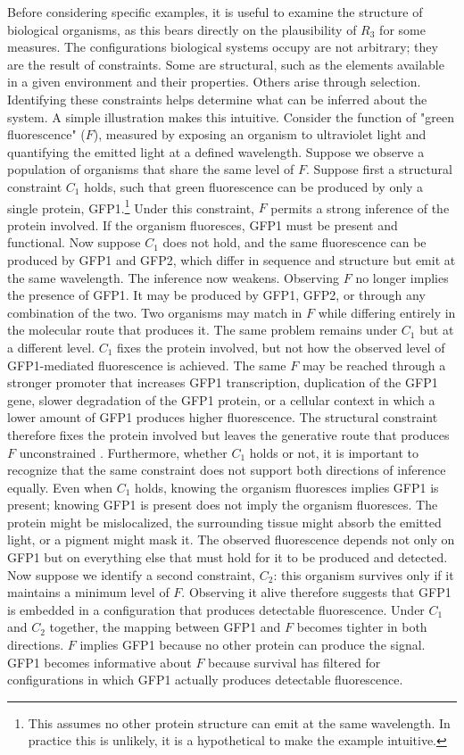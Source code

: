 \documentclass[twocolumn]{article} %
\begin{document}
Before considering specific examples, it is useful to examine the structure of biological organisms, as this bears directly on the plausibility of $R_3$ for some measures. The configurations biological systems occupy are not arbitrary; they are the result of constraints. Some are structural, such as the elements available in a given environment and their properties. Others arise through selection. Identifying these constraints helps determine what can be inferred about the system. A simple illustration makes this intuitive. Consider the function of "green fluorescence" ($F$), measured by exposing an organism to ultraviolet light and quantifying the emitted light at a defined wavelength. Suppose we observe a population of organisms that share the same level of $F$. Suppose first a structural constraint $C_1$ holds, such that green fluorescence can be produced by only a single protein, GFP1.\footnote{This assumes no other protein structure can emit at the same wavelength. In practice this is unlikely, it is a hypothetical to make the example intuitive.} Under this constraint, $F$ permits a strong inference of the protein involved. If the organism fluoresces, GFP1 must be present and functional. Now suppose $C_1$ does not hold, and the same fluorescence can be produced by GFP1 and GFP2, which differ in sequence and structure but emit at the same wavelength. The inference now weakens. Observing $F$ no longer implies the presence of GFP1. It may be produced by GFP1, GFP2, or through any combination of the two. Two organisms may match in $F$ while differing entirely in the molecular route that produces it. The same problem remains under $C_1$ but at a different level. $C_1$ fixes the protein involved, but not how the observed level of GFP1-mediated fluorescence is achieved. The same $F$ may be reached through a stronger promoter that increases GFP1 transcription, duplication of the GFP1 gene, slower degradation of the GFP1 protein, or a cellular context in which a lower amount of GFP1 produces higher fluorescence. The structural constraint therefore fixes the protein involved but leaves the generative route that produces $F$ unconstrained \citep[a]{tononi1999measures}. Furthermore, whether $C_1$ holds or not, it is important to recognize that the same constraint does not support both directions of inference equally. Even when $C_1$ holds, knowing the organism fluoresces implies GFP1 is present; knowing GFP1 is present does not imply the organism fluoresces. The protein might be mislocalized, the surrounding tissue might absorb the emitted light, or a pigment might mask it. The observed fluorescence depends not only on GFP1 but on everything else that must hold for it to be produced and detected. Now suppose we identify a second constraint, $C_2$: this organism survives only if it maintains a minimum level of $F$. Observing it alive therefore suggests that GFP1 is embedded in a configuration that produces detectable fluorescence. Under $C_1$ and $C_2$ together, the mapping between GFP1 and $F$ becomes tighter in both directions. $F$ implies GFP1 because no other protein can produce the signal. GFP1 becomes informative about $F$ because survival has filtered for configurations in which GFP1 actually produces detectable fluorescence.
\end{document}
